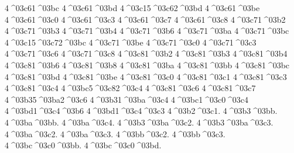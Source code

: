 {4^^^^03c61^^^^03bc 
4^^^^03c61^^^^03bd
4^^^^03c15^^^^03c62^^^^03bd %
4^^^^03c61^^^^03be
4^^^^03c61^^^^03c0
4^^^^03c61^^^^03c3
4^^^^03c61^^^^03c7
4^^^^03c61^^^^03c8
4^^^^03c71^^^^03b2
4^^^^03c71^^^^03b3
4^^^^03c71^^^^03b4
4^^^^03c71^^^^03b6
4^^^^03c71^^^^03ba
4^^^^03c71^^^^03bc
4^^^^03c15^^^^03c72^^^^03bc %
4^^^^03c71^^^^03be
4^^^^03c71^^^^03c0
4^^^^03c71^^^^03c3
4^^^^03c71^^^^03c6
4^^^^03c71^^^^03c8
4^^^^03c81^^^^03b2
4^^^^03c81^^^^03b3
4^^^^03c81^^^^03b4
4^^^^03c81^^^^03b6
4^^^^03c81^^^^03b8
4^^^^03c81^^^^03ba
4^^^^03c81^^^^03bb
4^^^^03c81^^^^03bc
4^^^^03c81^^^^03bd
4^^^^03c81^^^^03be
4^^^^03c81^^^^03c0
4^^^^03c81^^^^03c1
4^^^^03c81^^^^03c3
4^^^^03c81^^^^03c4
4^^^^03bc5^^^^03c82^^^^03c4 %
4^^^^03c81^^^^03c6
4^^^^03c81^^^^03c7
4^^^^03b35^^^^03ba2^^^^03c6 %
4^^^^03b31^^^^03ba^^^^03c4  %
4^^^^03bc1^^^^03c0^^^^03c4  %
4^^^^03bd1^^^^03c4^^^^03b6  %
4^^^^03bd1^^^^03c4^^^^03c3  %
4^^^^03b2^^^^03c1.  %
4^^^^03b3^^^^03bb.  %
4^^^^03ba^^^^03bb.  %
4^^^^03ba^^^^03c4.  %
4^^^^03b3^^^^03ba^^^^03c2. %
4^^^^03b3^^^^03ba^^^^03c3.
4^^^^03ba^^^^03c2.  %
4^^^^03ba^^^^03c3.
4^^^^03bb^^^^03c2.  %
4^^^^03bb^^^^03c3.
4^^^^03bc^^^^03c0^^^^03bb. %
4^^^^03bc^^^^03c0^^^^03bd. %
}
